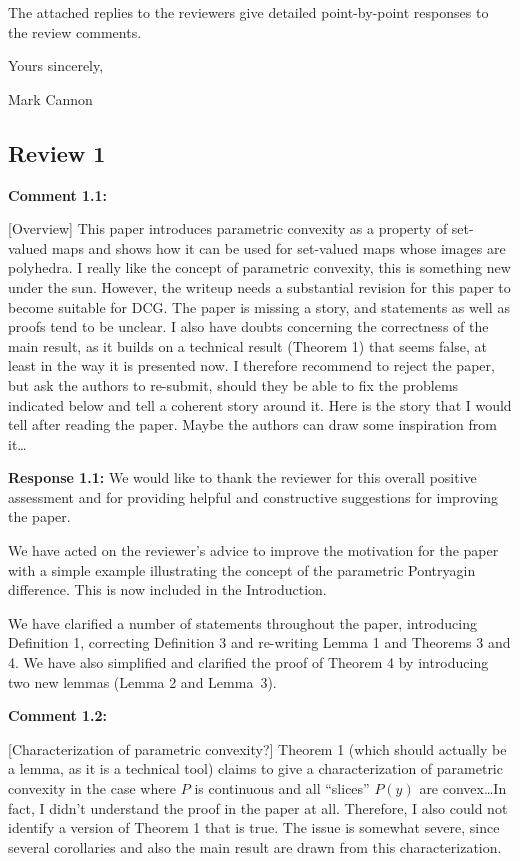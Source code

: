 \documentclass[11pt, a4paper]{article}
\newcommand{\comment}[1]{{%
\begin{sffamily}\leavevmode\color{black}#1
\end{sffamily}}}%
\def\vv{\vspace{\baselineskip}}
\def\v{\vspace{2mm}}
\begin{document}
The attached replies to the reviewers give detailed point-by-point responses to the review comments.

Yours sincerely,


Mark Cannon

\newpage




\subsection*{Review 1}

\textbf{Comment 1.1:}
\comment{[Overview] This paper introduces parametric convexity as a property of set-valued maps and shows how it can be used for set-valued maps whose images are polyhedra.
I really like the concept of parametric convexity, this is something new under the sun. However, the writeup needs a substantial revision for this paper to become suitable for DCG. The paper is missing a story, and statements as well as proofs tend to be unclear. I also have doubts concerning the correctness of the main result, as it builds on a technical result (Theorem 1) that seems false, at least in the way it is presented now.
I therefore recommend to reject the paper, but ask the authors to re-submit, should they be able to fix the problems indicated below and tell a coherent story around it.
Here is the story that I would tell after reading the paper. Maybe the authors can draw some inspiration from it\dots}

\v
\textbf{Response 1.1:}
We would like to thank the reviewer for this overall positive assessment and for providing helpful and constructive suggestions for improving the paper. 

We have acted on the reviewer's advice to improve the motivation for the paper with a simple example illustrating the concept of the parametric Pontryagin difference. This is now included in the Introduction.  

We have clarified a number of statements throughout the paper, introducing Definition 1, correcting Definition 3 and re-writing Lemma 1 and Theorems 3 and 4. We have also simplified and clarified the proof of Theorem 4 by introducing two new lemmas (Lemma 2 and Lemma~3). 

\v
\textbf{Comment 1.2:}
\comment{
[Characterization of parametric convexity?] Theorem 1 (which should
actually be a lemma, as it is a technical tool) claims to give a characterization 
of parametric convexity in the case where $P$ is continuous and all ``slices'' $P(y)$ are convex\dots In fact, I didn’t understand the proof in the paper at all. Therefore, I also could not identify a version of Theorem 1 that is true. The issue is somewhat severe, since several corollaries and also the main result are drawn from this characterization.
}
\end{document}
